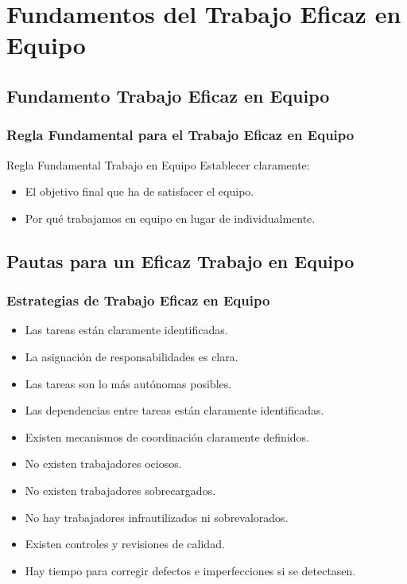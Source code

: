 \documentclass[a4paper,slidestop,xcolor=pst,dvips,blue]{beamer}
\begin{document}
\section{Fundamentos del Trabajo Eficaz en Equipo}

\subsection{Fundamento Trabajo Eficaz en Equipo}

\begin{frame}[c]
	\frametitle{Regla Fundamental para el Trabajo Eficaz en Equipo}
	\begin{block}{Regla Fundamental Trabajo en Equipo}
		Establecer claramente:
		\begin{itemize}
			\item<2-> El objetivo final que ha de satisfacer el equipo.
			\item<3-> Por qué trabajamos en equipo en lugar de individualmente.
		\end{itemize}
	\end{block}
\end{frame}

\subsection{Pautas para un Eficaz Trabajo en Equipo}

\begin{frame}[c]
	\frametitle{Estrategias de Trabajo Eficaz en Equipo}
	\begin{itemize}[<+->]
		\item Las tareas están claramente identificadas.
		\item La asignación de responsabilidades es clara.
		\item Las tareas son lo más autónomas posibles.
		\item Las dependencias entre tareas están claramente identificadas.
		\item Existen mecanismos de coordinación claramente definidos.
		\item No existen trabajadores ociosos.
		\item No existen trabajadores sobrecargados.
		\item No hay trabajadores infrautilizados ni sobrevalorados.
		\item Existen controles y revisiones de calidad.
		\item Hay tiempo para corregir defectos e imperfecciones si se detectasen.
	\end{itemize}
\end{frame}
\end{document}
